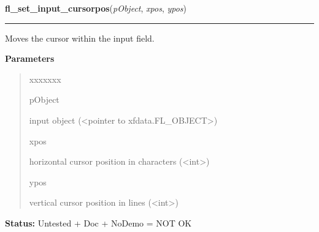 \hspace{.8\funcindent}\begin{boxedminipage}{\funcwidth}

    \raggedright \textbf{fl\_set\_input\_cursorpos}(\textit{pObject}, \textit{xpos}, \textit{ypos})

    \vspace{-1.5ex}

    \rule{\textwidth}{0.5\fboxrule}
\setlength{\parskip}{2ex}
    Moves the cursor within the input field.

\setlength{\parskip}{1ex}
      \textbf{Parameters}
      \vspace{-1ex}

      \begin{quote}
        \begin{Ventry}{xxxxxxx}

          \item[pObject]

          input object ({\textless}pointer to 
          xfdata.FL\_OBJECT{\textgreater})

          \item[xpos]

          horizontal cursor position in characters 
          ({\textless}int{\textgreater})

          \item[ypos]

          vertical cursor position in lines ({\textless}int{\textgreater})

        \end{Ventry}

      \end{quote}

\textbf{Status:} Untested + Doc + NoDemo = NOT OK



    \end{boxedminipage}

    \label{xformslib:library:fl_set_input_selected}

    \vspace{0.5ex}


